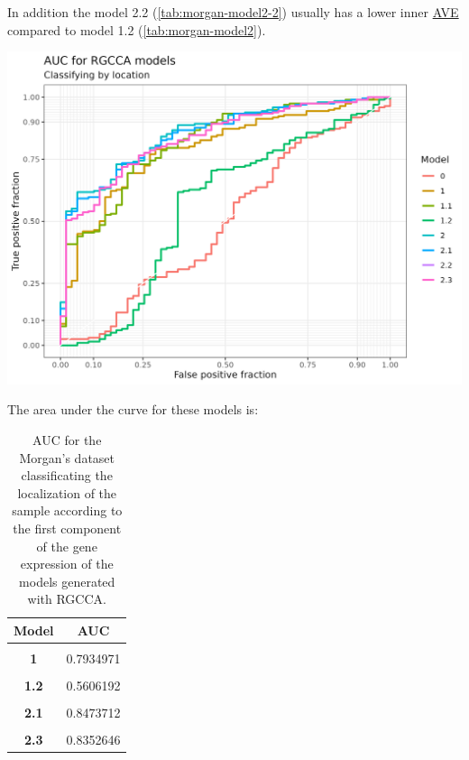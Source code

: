 \documentclass[
  12pt,
  a4paper,
  twoside,
  openright]{book}
\let\origfigure\figure
\let\endorigfigure\endfigure
\renewenvironment{figure}[1][2] {
    \expandafter\origfigure\expandafter[!htbp]
} {
    \endorigfigure
}
\begin{document}
In addition the model 2.2 (\ref{tab:morgan-model2-2}) usually has a lower inner \protect\hyperlink{acronyms_AVE}{AVE} compared to model 1.2 (\ref{tab:morgan-model2}).

\begin{figure}
\includegraphics[width=1\linewidth]{images/morgan-auc} \caption[AUC of RGCCA models in the Morgan's dataset]{AUC of RGCCA models in the Morgan's dataset. The classification of the localization of the sample according to the first component of the gene expression of the models generated with RGCCA on the Morgan's dataset.}\label{fig:morgan-auc-plot}
\end{figure}

The area under the curve for these models is:

\begin{table}[H]

\caption[AUC for the Morgan's dataset]{\label{tab:morgan-auc}AUC for the Morgan's dataset classificating the localization of the sample according to the first component of the gene expression of the models generated with RGCCA.}
\centering
\begin{tabular}[t]{>{}c|c}
\hline
\textbf{Model} & \textbf{AUC}\\
\hline
\textbf{\cellcolor{gray!6}{0}} & \cellcolor{gray!6}{0.4969734}\\
\hline
\textbf{1} & 0.7934971\\
\hline
\textbf{\cellcolor{gray!6}{1.1}} & \cellcolor{gray!6}{0.8161536}\\
\hline
\textbf{1.2} & 0.5606192\\
\hline
\textbf{\cellcolor{gray!6}{2}} & \cellcolor{gray!6}{0.8546351}\\
\hline
\textbf{2.1} & 0.8473712\\
\hline
\textbf{\cellcolor{gray!6}{2.2}} & \cellcolor{gray!6}{0.8352646}\\
\hline
\textbf{2.3} & 0.8352646\\
\hline
\end{tabular}
\end{table}
\end{document}
